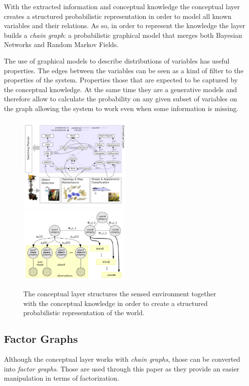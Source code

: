 \documentclass[runningheads,a4paper]{llncs}
\begin{document}
With the extracted information and conceptual knowledge the conceptual layer creates a structured probabilistic representation
in order to model all known variables and their relations.
As so, in order to represent the knowledge the layer builds a \emph{chain graph}:
a probabilistic graphical model that merges both Bayesian Networks and Random Markov Fields.

The use of graphical models to describe distributions of variables has useful properties.
The edges between the variables can be seen as a kind of filter to the properties of the system.
Properties those that are expected to be captured by the conceptual knowledge.
At the same time they are a generative models and therefore allow to calculate the probability
on any given subset of variables on the graph allowing the system to work even when some
information is missing.


\begin{figure}[h]
\centering

\includegraphics[width=0.50\textwidth]{figures/conceptual-layer.jpg}
\includegraphics[width=0.49\textwidth]{figures/chain-graph.png}
\caption{The conceptual layer structures the sensed environment together with the conceptual knowledge
         in order to create a structured probabilistic representation of the world.}
\end{figure}

\subsection{Factor Graphs}
Although the conceptual layer works with \emph{chain graphs}, those can be converted into \emph{factor graphs}.
Those are used through this paper as they provide an easier manipulation in terms of factorization.
\end{document}
